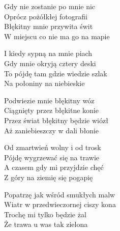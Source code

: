\begin{text}
    Gdy nie zostanie po mnie nic\\
    Oprócz pożółkłej fotografii\\
    Błękitny mnie przywita świt	\\
    W miejscu co nie ma go na mapie

    I kiedy sypną na mnie piach\\
    Gdy mnie okryją cztery deski\\
    To pójdę tam gdzie wiedzie szlak\\
    Na połoniny na niebieskie

    Podwiezie mnie błękitny wóz\\
    Ciągnięty przez błękitne konie\\
    Przez świat błękitny będzie wiózł\\
    Aż zaniebieszczy w dali błonie

    Od zmartwień wolny i od trosk\\
    Pójdę wygrzewać się na trawie\\
    A czasem gdy mi przyjdzie chęć\\
    Z góry na ziemię się pogapię

    Popatrzę jak wśród smukłych malw\\
    Wiatr w przedwieczornej ciszy kona\\
    Trochę mi tylko będzie żal\\
    Że trawa u was tak zielona
\end{text}
\begin{chord}

\end{chord}